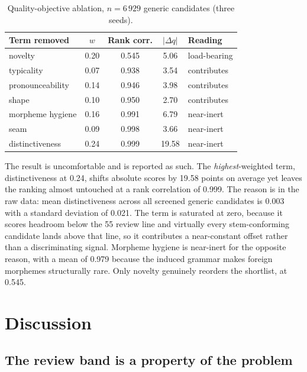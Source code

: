 \documentclass[conference]{IEEEtran}
\begin{document}
\begin{table}[t]
\caption{Quality-objective ablation, $n = 6\,929$ generic candidates (three
seeds).}
\label{tab:ablate-q}
\centering
\footnotesize
\begin{tabular}{lcccl}
\toprule
Term removed & $w$ & Rank corr. & $|\Delta q|$ & Reading \\
\midrule
novelty          & 0.20 & 0.545 & 5.06  & load-bearing \\
typicality       & 0.07 & 0.938 & 3.54  & contributes \\
pronounceability & 0.14 & 0.946 & 3.98  & contributes \\
shape            & 0.10 & 0.950 & 2.70  & contributes \\
morpheme hygiene & 0.16 & 0.991 & 6.79  & near-inert \\
seam             & 0.09 & 0.998 & 3.66  & near-inert \\
distinctiveness  & 0.24 & 0.999 & 19.58 & near-inert \\
\bottomrule
\end{tabular}
\end{table}

The result is uncomfortable and is reported as such. The
\emph{highest}-weighted term, distinctiveness at 0.24, shifts absolute scores by
19.58 points on average yet leaves the ranking almost untouched at a rank
correlation of 0.999. The reason is in the raw data: mean distinctiveness across
all screened generic candidates is 0.003 with a standard deviation of 0.021. The
term is saturated at zero, because it scores headroom below the 55 review line
and virtually every stem-conforming candidate lands above that line, so it
contributes a near-constant offset rather than a discriminating signal. Morpheme
hygiene is near-inert for the opposite reason, with a mean of 0.979 because the
induced grammar makes foreign morphemes structurally rare. Only novelty
genuinely reorders the shortlist, at 0.545.

\section{Discussion}

\subsection{The review band is a property of the problem}
\end{document}
